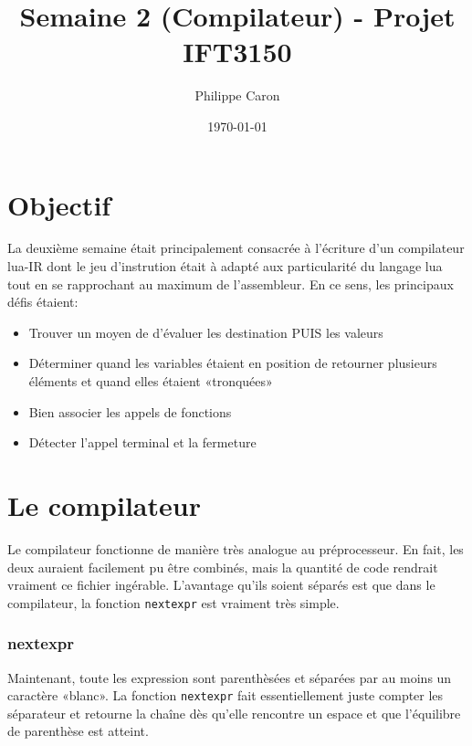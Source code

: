 \documentclass{article}
\title{Semaine 2 (Compilateur) - Projet IFT3150}
\date{\today}
\author{Philippe Caron}
\begin{document}
\maketitle

\section{Objectif}
La deuxième semaine était principalement consacrée à l'écriture d'un compilateur lua-IR dont le jeu d'instrution était à adapté aux particularité du langage lua tout en se rapprochant au maximum  de l'assembleur. En ce sens, les principaux défis étaient:
\begin{itemize}
\item Trouver un moyen de d'évaluer les destination PUIS les valeurs
\item Déterminer quand les variables étaient en position de retourner plusieurs éléments et quand elles étaient «tronquées»
\item Bien associer les appels de fonctions
\item Détecter l'appel terminal et la fermeture
\end{itemize}

\section{Le compilateur}
Le compilateur fonctionne de manière très analogue au préprocesseur. En fait, les deux auraient facilement pu être combinés, mais la quantité de code rendrait vraiment ce fichier ingérable. L'avantage qu'ils soient séparés est que dans le compilateur, la fonction \texttt{nextexpr} est vraiment très simple.

\subsubsection{nextexpr}
Maintenant, toute les expression sont parenthèsées et séparées par au moins un caractère «blanc». La fonction \texttt{nextexpr} fait essentiellement juste compter les séparateur et retourne la chaîne dès qu'elle rencontre un espace et que l'équilibre de parenthèse est atteint.
\end{document}
